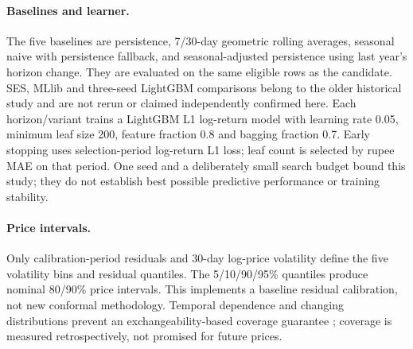 \paragraph{Baselines and learner.}
The five baselines are persistence, 7/30-day geometric rolling averages, seasonal naive with persistence fallback, and seasonal-adjusted persistence using last year's horizon change. They are evaluated on the same eligible rows as the candidate. SES, MLlib and three-seed LightGBM comparisons belong to the older historical study and are not rerun or claimed independently confirmed here.
Each horizon/variant trains a LightGBM L1 log-return model with learning rate 0.05, minimum leaf size 200, feature fraction 0.8 and bagging fraction 0.7. Early stopping uses selection-period log-return L1 loss; leaf count is selected by rupee MAE on that period. One seed and a deliberately small search budget bound this study; they do not establish best possible predictive performance or training stability.

\paragraph{Price intervals.}
Only calibration-period residuals and 30-day log-price volatility define the five volatility bins and residual quantiles. The 5/10/90/95\% quantiles produce nominal 80/90\% price intervals. This implements a baseline residual calibration, not new conformal methodology. Temporal dependence and changing distributions prevent an exchangeability-based coverage guarantee \cite{gibbs2021adaptive}; coverage is measured retrospectively, not promised for future prices.
